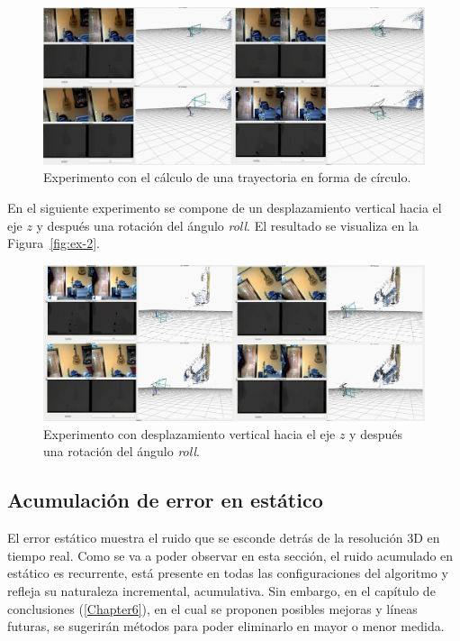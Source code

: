 \begin{figure}[th]
\centering
\includegraphics[scale=0.2]{Figures/tests/ex-1.png}
\decoRule
\caption[Experimento con el cálculo de una trayectoria en forma de círculo]{Experimento con el cálculo de una trayectoria en forma de círculo.}
\label{fig:ex1}
\end{figure}
 
En el siguiente experimento se compone de un desplazamiento vertical hacia el eje $z$ y después una rotación del ángulo \textit{roll}. El resultado se visualiza en la Figura~\ref{fig:ex-2}.
 
\begin{figure}[th]
\centering
\includegraphics[scale=0.2]{Figures/tests/ex-2.png}
\decoRule
\caption[Experimento con desplazamiento vertical hacia el eje $z$ y después una rotación del ángulo \textit{roll}]{Experimento con desplazamiento vertical hacia el eje $z$ y después una rotación del ángulo \textit{roll}.}
\label{fig:ex2}
\end{figure}


\subsection{Acumulación de error en estático}

El error estático muestra el ruido que se esconde detrás de la resolución 3D en tiempo real. Como se va a poder observar en esta sección, el ruido acumulado en estático es recurrente, está presente en todas las configuraciones del algoritmo y refleja su naturaleza incremental, acumulativa. Sin embargo, en el capítulo de conclusiones (\ref{Chapter6}), en el cual se proponen posibles mejoras y líneas futuras, se sugerirán métodos para poder eliminarlo en mayor o menor medida.

